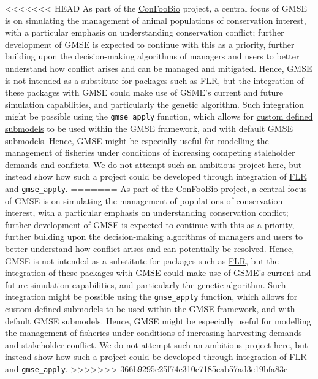\documentclass[]{article}
\begin{document}
\textless{}\textless{}\textless{}\textless{}\textless{}\textless{}\textless{}
HEAD As part of the \href{https://sti-cs.org/confoobio/}{ConFooBio}
project, a central focus of GMSE is on simulating the management of
animal populations of conservation interest, with a particular emphasis
on understanding conservation conflict; further development of GMSE is
expected to continue with this as a priority, further building upon the
decision-making algorithms of managers and users to better understand
how conflict arises and can be managed and mitigated. Hence, GMSE is not
intended as a substitute for packages such as
\href{http://www.flr-project.org/}{FLR}, but the integration of these
packages with GMSE could make use of GSME's current and future
simulation capabilities, and particularly the \href{}{genetic
algorithm}. Such integration might be possible using the
\texttt{gmse\_apply} function, which allows for \href{}{custom defined
submodels} to be used within the GMSE framework, and with default GMSE
submodels. Hence, GMSE might be especially useful for modelling the
management of fisheries under conditions of increasing competing
staleholder demands and conflicts. We do not attempt such an ambitious
project here, but instead show how such a project could be developed
through integration of \href{http://www.flr-project.org/}{FLR} and
\texttt{gmse\_apply}. ======= As part of the
\href{https://sti-cs.org/confoobio/}{ConFooBio} project, a central focus
of GMSE is on simulating the management of populations of conservation
interest, with a particular emphasis on understanding conservation
conflict; further development of GMSE is expected to continue with this
as a priority, further building upon the decision-making algorithms of
managers and users to better understand how conflict arises and can
potentially be resolved. Hence, GMSE is not intended as a substitute for
packages such as \href{http://www.flr-project.org/}{FLR}, but the
integration of these packages with GMSE could make use of GSME's current
and future simulation capabilities, and particularly the \href{}{genetic
algorithm}. Such integration might be possible using the
\texttt{gmse\_apply} function, which allows for \href{}{custom defined
submodels} to be used within the GMSE framework, and with default GMSE
submodels. Hence, GMSE might be especially useful for modelling the
management of fisheries under conditions of increasing harvesting
demands and stakeholder conflict. We do not attempt such an ambitious
project here, but instead show how such a project could be developed
through integration of \href{http://www.flr-project.org/}{FLR} and
\texttt{gmse\_apply}.
\textgreater{}\textgreater{}\textgreater{}\textgreater{}\textgreater{}\textgreater{}\textgreater{}
366b9295e25f74c310c7185eab57ad3e19bfa83c
\end{document}
